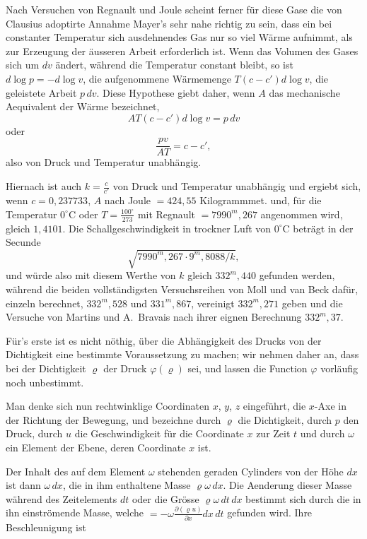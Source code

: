 \documentclass[12pt,a4paper]{article}
\begin{document}
Nach Versuchen von Regnault und Joule scheint ferner f\"ur diese Gase die von Clausius adoptirte Annahme Mayer's sehr nahe richtig zu sein, dass ein bei constanter Temperatur sich ausdehnendes Gas nur so viel W\"arme aufnimmt, als zur Erzeugung der \"ausseren Arbeit erforderlich ist. Wenn das Volumen des Gases sich um $dv$ \"andert, w\"ahrend die Temperatur constant bleibt, so ist $d\log p = -d\log v$, die aufgenommene W\"armemenge $T(c-c')d\log v$, die geleistete Arbeit $p\,dv$. Diese Hypothese giebt daher, wenn $A$ das mechanische Aequivalent der W\"arme bezeichnet,
\[
AT(c-c')d\log v = p\,dv
\]
oder
\[
\frac{pv}{AT} = c - c',
\]
also von Druck und Temperatur unabh\"angig.

Hiernach ist auch $k = \frac{c}{c'}$ von Druck und Temperatur unabh\"angig und ergiebt sich, wenn $c = 0{,}237733$, $A$ nach Joule $= 424{,}55$ Kilogrammmet. und, f\"ur die Temperatur $0^{\circ}$C oder $T = \frac{100^{\circ}}{273}$ mit Regnault $= 7990^{m},267$ angenommen wird, gleich $1{,}4101$. Die Schallgeschwindigkeit in trockner Luft von $0^{\circ}$C betr\"agt in der Secunde
\[
\sqrt{7990^{m},267 \cdot 9^{m},8088/k},
\]
und w\"urde also mit diesem Werthe von $k$ gleich $332^{m},440$ gefunden werden, w\"ahrend die beiden vollst\"andigsten Versuchsreihen von Moll und van Beck daf\"ur, einzeln berechnet, $332^{m},528$ und $331^{m},867$, vereinigt $332^{m},271$ geben und die Versuche von Martins und A.~Bravais nach ihrer eignen Berechnung $332^{m},37$.

F\"ur's erste ist es nicht n\"othig, \"uber die Abh\"angigkeit des Drucks von der Dichtigkeit eine bestimmte Voraussetzung zu machen; wir nehmen daher an, dass bei der Dichtigkeit $\varrho$ der Druck $\varphi(\varrho)$ sei, und lassen die Function $\varphi$ vorl\"aufig noch unbestimmt.

Man denke sich nun rechtwinklige Coordinaten $x$, $y$, $z$ eingef\"uhrt, die $x$-Axe in der Richtung der Bewegung, und bezeichne durch $\varrho$ die Dichtigkeit, durch $p$ den Druck, durch $u$ die Geschwindigkeit f\"ur die Coordinate $x$ zur Zeit $t$ und durch $\omega$ ein Element der Ebene, deren Coordinate $x$ ist.

Der Inhalt des auf dem Element $\omega$ stehenden geraden Cylinders von der H\"ohe $dx$ ist dann $\omega\,dx$, die in ihm enthaltene Masse $\varrho\omega\,dx$. Die Aenderung dieser Masse w\"ahrend des Zeitelements $dt$ oder die Gr\"osse $\varrho\omega\,dt\,dx$ bestimmt sich durch die in ihn einstr\"omende Masse, welche $= -\omega\frac{\partial(\varrho u)}{\partial x}dx\,dt$ gefunden wird. Ihre Beschleunigung ist
\end{document}
